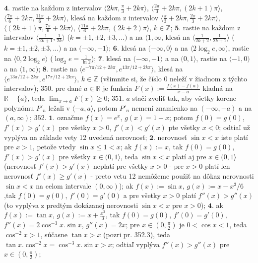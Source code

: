 $\boldsymbol{4.}$ rastie na každom z intervalov $\langle 2k\pi, \frac {\pi}{3}+2k\pi \rangle$, $\langle \frac{2\pi}{3}+2k\pi,(2k+1)\pi \rangle$, $\langle \frac{7\pi}{6}+2k\pi,\frac{11\pi}{6}+2k\pi \rangle$, klesá na každom z intervalov $\langle \frac{\pi}{3}+2k\pi,\frac{2\pi}{3}+2k\pi \rangle$, $\langle (2k+1)\pi,\frac{7\pi}{6}+2k\pi \rangle$, $\langle \frac{11\pi}{6}+2k\pi,(2k+2)\pi \rangle$, $k \in \mathbb{Z}$;
$\boldsymbol{5.}$ rastie na každom z intervalov $\langle \frac{1}{2k+1}, \frac{1}{2k}\rangle$ ($k=\pm 1,\pm 2,\pm 3,...)$ a na $\langle 1,\infty$, klesá na $\langle \frac{1}{2k+2}, \frac{1}{2k+1}\rangle$ ($k=\pm 1,\pm 2,\pm 3,...)$ a na $(-\infty , -1\rangle$;
$\boldsymbol{6.}$ klesá na $(-\infty , 0\rangle$ a na $\langle 2\log _{2}e,\infty)$, rastie na $\langle 0, 2\log _{2}e\rangle$ ($\log _{2}e=\frac{1}{\ln 2} $);
$\boldsymbol{7.}$ klesá na $(-\infty , -1\rangle$ a na $(0,1\rangle$, rastie na $\langle -1, 0)$ a na $\langle 1,\infty)$;
$\boldsymbol{8.}$ rastie na $\langle e^{-7\pi/12+2k\pi},e^{13\pi/12+2k\pi}\rangle$,   klesá na $\langle e^{13\pi/12+2k\pi},e^{17\pi/12+2k\pi}\rangle$, $k\in \mathbb{Z}$ (všimnite si, že číslo $0$ neleží v žiadnom z týchto intervalov);
$\boxed{350.}$ pre dané $a\in \mathbb{R}$ je funkcia $F(x):= \frac{f(x)-f(a)}{x-a}$ kladná na $\mathbb{R}- \lbrace a \rbrace$, teda $\lim_{x \to a}F(x)\geq 0$;
$\boxed{351.}$ $a$ stačí zvoliť tak, aby všetky korene polynómu $P'_{n}$ ležali v $\langle -a,a \rangle$, potom $P'_{n}$ nemení znamienko na $(-\infty, -a)$ a na $(a, \infty)$;
$\boxed{352.}$ $\boldsymbol{1.}$ označme $f(x)=e^{x}$, $g(x)=1+x$; potom $f(0)=g(0)$, $f'(x)>g'(x)$ pre všetky $x>0$, $f'(x)<g'(x)$ pte všetky $x<0$; odtiaľ už vyplýva na základe vety 12 uvedená nerovnosť;
$\boldsymbol{2.}$ nerovnosť $\sin x< x$ iste platí pre $x>1$, petože vtedy $\sin x\leq 1<x$; ak $f(x):=x$, tak $f(0)=g(0)$, $f'(x)>g'(x)$ pre všetky $x \in (0,1 \rangle$, teda $\sin x<x$ platí aj pre $x \in (0,1 \rangle$ (nerovnosť $f'(x)>g'(x)$ neplatí pre všetky $x>0$ - pre  $x>0$ platí len nerovnosť $f'(x)\geq g'(x)$ - preto vetu 12 nemôžeme použiť na dôkaz nerovnosti $\sin x<x$ na celom intervale $(0, \infty)$); ak $f(x):= \sin x$, $g(x):=x-x^{3}/6 $,tak $f(0)=g(0)$, $f'(0)=g'(0)$ a  pre všetky $x>0 $ platí  $f''(x)>g''(x)$  (to vyplýva z predtým dokázanej nerovnosti $\sin x<x$ pre  $x>0 $);
$\boldsymbol{4.}$ ak $f(x):=\tan x$, $g(x):=x+\frac{x^{3}}{3}$, tak $f(0)=g(0)$, $f'(0)=g'(0)$, $f''(x)=2 \cos ^{-3}x.\sin x$, $g''(x)=2x$; pre  $x \in (0,\frac{\pi}{2})$ je $0<\cos x<1$, teda $\cos^{-2}x>1 $, súčasne  $\tan x>x $ (pozri pr. 352.3), teda $\tan x. \cos^{-2}x=\cos^{-3}x.\sin x>x$; odtiaľ vyplýva $f''(x)>g''(x)$ pre  $x \in (0,\frac{\pi}{2})$;
